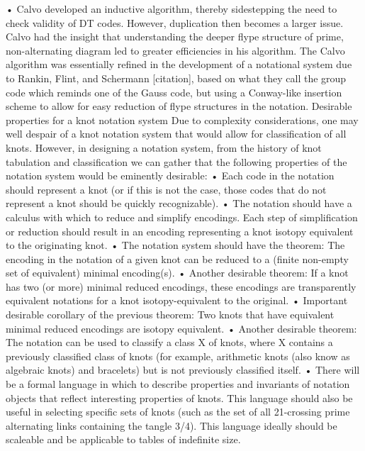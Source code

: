 \documentclass[12pt]{amsart}
\begin{document}
• Calvo developed an inductive algorithm, thereby sidestepping the need to check validity of DT codes. However, duplication then becomes a larger issue. Calvo had the insight that understanding the deeper flype structure of prime, non-alternating diagram led to greater efficiencies in his algorithm. The Calvo algorithm was essentially refined in the development of a notational system due to Rankin, Flint, and Schermann [citation], based on what they call the group code which reminds one of the Gauss code, but using a Conway-like insertion scheme to allow for easy reduction of flype structures in the notation.
Desirable properties for a knot notation system
Due to complexity considerations, one may well despair of a knot notation system that would allow for classification of all knots. However, in designing a notation system, from the history of knot tabulation and classification we can gather that the following properties of the notation system would be eminently desirable:
• Each code in the notation should represent a knot (or if this is not the case, those codes that do not represent a knot should be quickly recognizable).
• The notation should have a calculus with which to reduce and simplify encodings. Each step of simplification or reduction should result in an encoding representing a knot isotopy equivalent to the originating knot.
• The notation system should have the theorem: The encoding in the notation of a given knot can be reduced to a (finite non-empty set of equivalent) minimal encoding(s).
• Another desirable theorem: If a knot has two (or more) minimal reduced encodings, these encodings are transparently equivalent notations for a knot isotopy-equivalent to the original.
• Important desirable corollary of the previous theorem: Two knots that have equivalent minimal reduced encodings are isotopy equivalent.
• Another desirable theorem: The notation can be used to classify a class X of knots, where X contains a previously classified class of knots (for example, arithmetic knots (also know as algebraic knots) and bracelets) but is not previously classified itself.
• There will be a formal language in which to describe properties and invariants of notation objects that reflect interesting properties of knots. This language should also be useful in selecting specific sets of knots (such as the set of all 21-crossing prime alternating links containing the tangle 3/4). This language ideally should be scaleable and be applicable to tables of indefinite size.
\end{document}
